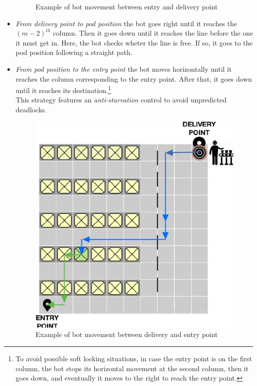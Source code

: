 \documentclass{article}
\begin{document}
\begin{itemize}
\begin{figure}[ht]
						\caption{Example of bot movement between entry and delivery point}
					\end{figure}
					\item \emph{From delivery point to pod position} the bot goes right until it reaches the ${(m-2)}^{th}$ column. Then it goes down until it reaches the line before the one it must get in. Here, the bot checks wheter the line is free. If so, it goes to the pod position following a straight path.
					\item \emph{From pod position to the entry point} the bot moves horizontally until it reaches the column corresponding to the entry point. After that, it goes down until it reaches its destination.\footnote{To avoid possible soft locking situations, in case the entry point is on the first column, the bot stops its horizontal movement at the second column, then it goes down, and eventually it moves to the right to reach the entry point.}\\This strategy features an \emph{anti-starvation} control to avoid unpredicted deadlocks.
					\begin{figure}[ht]
						\centering
						\includegraphics[scale = 0.36]{Images/BotMovement2.JPG}
						\caption{Example of bot movement between delivery and entry point}
					\end{figure}
				\end{itemize}
				
\end{document}
